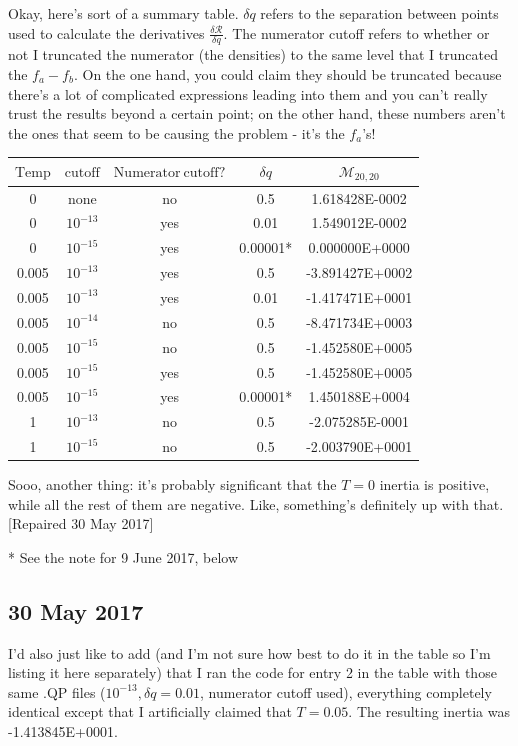 \documentclass[]{report}
\begin{document}
Okay, here's sort of a summary table. $\delta q$ refers to the separation between points used to calculate the derivatives $\frac{\delta \mathcal{R}}{\delta q}$. The numerator cutoff refers to whether or not I truncated the numerator (the densities) to the same level that I truncated the $f_a-f_b$. On the one hand, you could claim they should be truncated because there's a lot of complicated expressions leading into them and you can't really trust the results beyond a certain point; on the other hand, these numbers aren't the ones that seem to be causing the problem - it's the $f_a$'s!

\begin{tabular}{|c|c|c|c|c|}
\hline
$\mathrm{Temp}$ & $\mathrm{cutoff}$ & $\mathrm{Numerator\ cutoff?}$ & $\delta q$ & $\mathcal{M}_{20,20}$ \\ \hline\hline
0      &  none       & no   & 0.5  &  1.618428E-0002  \\\hline
0      &  $10^{-13}$   & yes  & 0.01 &  1.549012E-0002  \\\hline
0      &  $10^{-15}$   & yes  & 0.00001* &  0.000000E+0000  \\\hline
0.005  &  $10^{-13}$   & yes  & 0.5  & -3.891427E+0002  \\\hline
0.005  &  $10^{-13}$   & yes  & 0.01 & -1.417471E+0001  \\\hline
0.005  &  $10^{-14}$   & no   & 0.5  & -8.471734E+0003  \\\hline
0.005  &  $10^{-15}$   & no   & 0.5  & -1.452580E+0005  \\\hline
0.005  &  $10^{-15}$   & yes  & 0.5  & -1.452580E+0005  \\\hline
0.005  &  $10^{-15}$   & yes  & 0.00001*  & 1.450188E+0004  \\\hline
1      &  $10^{-13}$   & no   & 0.5  & -2.075285E-0001  \\\hline
1      &  $10^{-15}$   & no   & 0.5  & -2.003790E+0001  \\\hline
\end{tabular}

Sooo, another thing: it's probably significant that the $T=0$ inertia is positive, while all the rest of them are negative. Like, something's definitely up with that. [Repaired 30 May 2017]

* See the note for 9 June 2017, below

\subsection*{30 May 2017}
I'd also just like to add (and I'm not sure how best to do it in the table so I'm listing it here separately) that I ran the code for entry 2 in the table with those same .QP files ($10^{-13}, \delta q=0.01$, numerator cutoff used), everything completely identical except that I artificially claimed that $T=0.05$. The resulting inertia was -1.413845E+0001.
\end{document}
